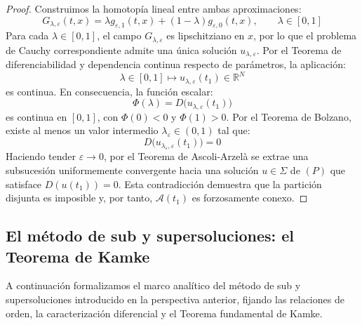 \begin{proof}
    Construimos la homotopía lineal entre ambas aproximaciones:
    \[
        G_{\lambda, \varepsilon}(t, x) = \lambda g_{\varepsilon, 1}(t, x) + (1 - \lambda) g_{\varepsilon, 0}(t, x), \qquad \lambda \in [0, 1]
    \]
    Para cada $\lambda \in [0, 1]$, el campo $G_{\lambda, \varepsilon}$ es lipschitziano en $x$, por lo que el problema de Cauchy correspondiente admite una única solución $u_{\lambda, \varepsilon}$. Por el Teorema de diferenciabilidad y dependencia continua respecto de parámetros, la aplicación:
    \[
        \lambda \in [0, 1] \longmapsto u_{\lambda, \varepsilon}(t_1) \in \mathbb{R}^N
    \]
    es continua. En consecuencia, la función escalar:
    \[
        \Phi(\lambda) = D\bigl(u_{\lambda, \varepsilon}(t_1)\bigr)
    \]
    es continua en $[0, 1]$, con $\Phi(0) < 0$ y $\Phi(1) > 0$. Por el Teorema de Bolzano, existe al menos un valor intermedio $\lambda_\varepsilon \in (0, 1)$ tal que:
    \[
        D\bigl(u_{\lambda_\varepsilon, \varepsilon}(t_1)\bigr) = 0
    \]
    Haciendo tender $\varepsilon \to 0$, por el Teorema de Ascoli-Arzelà se extrae una subsucesión uniformemente convergente hacia una solución $u \in \Sigma$ de $(P)$ que satisface $D(u(t_1)) = 0$. Esta contradicción demuestra que la partición disjunta es imposible y, por tanto, $\mathcal{A}(t_1)$ es forzosamente conexo.
\end{proof}

\subsection{El método de sub y supersoluciones: el Teorema de Kamke}\label{subsec:metodo_sub_supersoluciones_kamke}

A continuación formalizamos el marco analítico del método de sub y supersoluciones introducido en la perspectiva anterior, fijando las relaciones de orden, la caracterización diferencial y el Teorema fundamental de Kamke.

